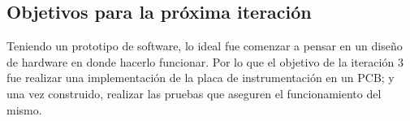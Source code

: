 \subsection{Objetivos para la próxima iteración} %
\label{it2:sub:objetivos_para_la_proxima_iteracion}

Teniendo un prototipo de software, lo ideal fue comenzar a pensar en un diseño de hardware en donde hacerlo funcionar. Por lo que el objetivo de la iteración 3 fue realizar una implementación de la placa de instrumentación en un PCB; y una vez construido, realizar las pruebas que aseguren el funcionamiento del mismo.


